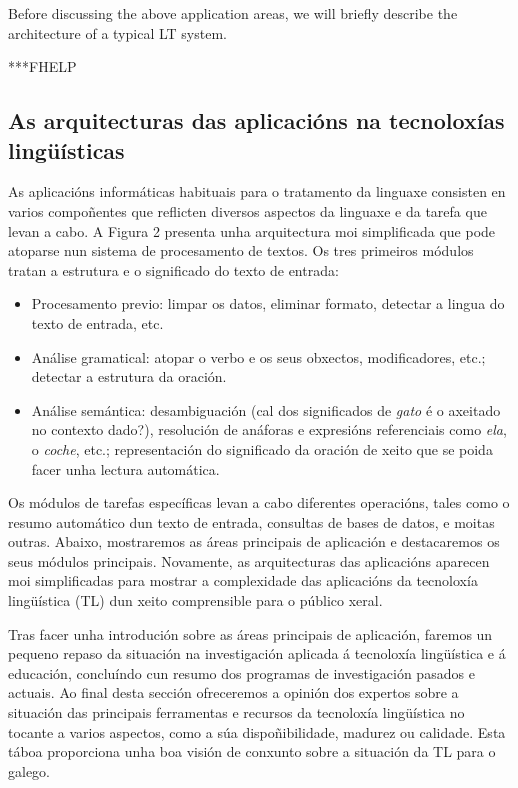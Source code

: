 \begin{multicols}{2}
Before discussing the above application areas, we will briefly describe the architecture of a typical LT system.

***FHELP

\subsection[As arquitecturas das aplicacións na tecnoloxías lingüísticas]{As arquitecturas das \newline aplicacións na tecnoloxías lingüísticas}

    As aplicacións informáticas habituais para o tratamento da linguaxe consisten en varios compoñentes que reflicten diversos aspectos da linguaxe e da tarefa que levan a cabo. A Figura 2 presenta unha arquitectura moi simplificada que pode atoparse nun sistema de procesamento de textos. Os tres primeiros módulos tratan a estrutura e o significado do texto de entrada:

\begin{itemize}
      \item Procesamento previo: limpar os datos, eliminar formato, detectar a lingua do texto de entrada, etc.
      \item Análise gramatical: atopar o verbo e os seus obxectos, modificadores, etc.; detectar a estrutura da oración.
      \item Análise semántica: desambiguación (cal dos significados de \textit{gato} é o axeitado no contexto dado?), resolución de anáforas e expresións referenciais como \textit{ela}, o \textit{coche}, etc.; representación do significado da oración de xeito que se poida facer unha lectura automática.
\end{itemize}


    Os módulos de tarefas específicas levan a cabo diferentes operacións, tales como o resumo automático dun texto de entrada, consultas de bases de datos, e moitas outras. Abaixo, mostraremos as áreas principais de aplicación e destacaremos os seus módulos principais. Novamente, as arquitecturas das aplicacións aparecen moi simplificadas para mostrar a complexidade das aplicacións da tecnoloxía lingüística (TL) dun xeito comprensible para o público xeral. 

Tras facer unha introdución sobre as áreas principais de aplicación, faremos un pequeno repaso da situación na investigación aplicada á tecnoloxía lingüística e á educación, concluíndo cun resumo dos programas de investigación pasados e actuais. Ao final desta sección ofreceremos a opinión dos expertos sobre a situación das principais ferramentas e recursos da tecnoloxía lingüística no tocante a varios aspectos, como a súa dispoñibilidade, madurez ou calidade. Esta táboa proporciona unha boa visión de conxunto sobre a situación da TL para o galego.


\end{multicols}
